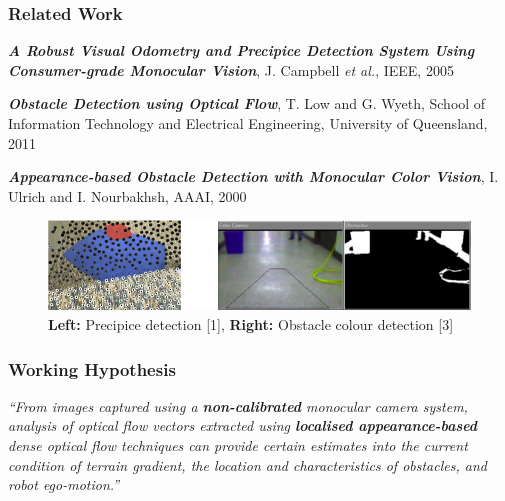 \documentclass[10pt, compress]{beamer}
\begin{document}
\begin{frame}[fragile]
  \frametitle{Related Work}
  
  	\begin{enumerate}[label={[\arabic*]}]
  	
  		\item \textbf{\textit{A Robust Visual Odometry and Precipice Detection
System Using Consumer-grade Monocular Vision}}, J. Campbell \textit{et al.}, IEEE, 2005

		\item \textbf{\textit{Obstacle Detection using Optical Flow}}, T. Low and G. Wyeth, School of Information Technology and Electrical Engineering, University of Queensland, 2011
		
		\item \textbf{\textit{Appearance-based Obstacle Detection with Monocular Color Vision}}, I. Ulrich and I. Nourbakhsh, AAAI, 2000
  			
  	\end{enumerate}
  	
  	\vspace{5pt}
  	
  	\begin{figure}[ht!]
\centering
\includegraphics[scale=0.3]{related_work.png}
    \caption{\textbf{Left:} Precipice detection [1], \textbf{Right:} Obstacle colour detection [3]}
  \end{figure}

  	
\end{frame}


\begin{frame}[fragile]
  \frametitle{Working Hypothesis}

	\hspace*{20pt} \textit{``From images captured using a \textbf{non-calibrated} monocular camera system, analysis of optical flow vectors extracted using \textbf{localised appearance-based} dense optical flow techniques can provide certain estimates into the current condition of terrain gradient, the location and characteristics of obstacles, and robot ego-motion.''}

\end{frame}
\end{document}
